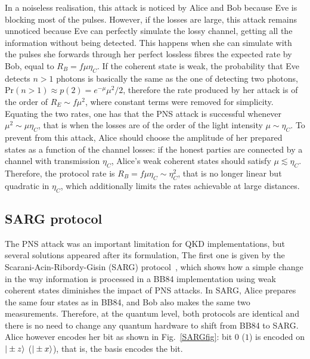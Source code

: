 \documentclass[a4paper]{article}
\begin{document}
In a noiseless realisation, this attack is noticed by Alice and Bob because Eve is blocking most of the pulses. However, if the losses are large, this attack remains unnoticed because Eve can perfectly simulate the lossy channel, getting all the information without being detected. This happens when she can simulate with the pulses she forwards through her perfect lossless fibres the expected rate by Bob, equal to $R_B=f\mu\eta_C$. If the coherent state is weak, the probability that Eve detects $n>1$ photons is basically the same as the one of detecting two photons, $\text{Pr}(n>1)\approx p(2)=e^{-\mu}\mu^2/2$, therefore the rate produced by her attack is of the order of $R_E\sim f\mu^2$, where constant terms were removed for simplicity. Equating the two rates, one has that the PNS attack is successful whenever $\mu^2\sim \mu\eta_C$, that is when the losses are of the order of the light intensity $\mu\sim\eta_C$. To prevent from this attack, Alice should choose the amplitude of her prepared states as a function of the channel losses: if the honest parties are connected by a channel with transmission $\eta_C$, Alice's weak coherent states should satisfy $\mu\lesssim\eta_C$. Therefore, the protocol rate is $R_B=f\mu\eta_C\sim\eta_C^2$, that is no longer linear but quadratic in $\eta_C$, which additionally limits the rates achievable at large distances.

\subsection{SARG protocol}

The PNS attack was an important limitation for QKD implementations, but several solutions appeared after its formulation, The first one is given by the Scarani-Acin-Ribordy-Gisin (SARG) protocol~\cite{SARG}, which shows how a simple change in the way information is processed in a BB84 implementation using weak coherent states diminishes the impact of PNS attacks. In SARG, Alice prepares the same four states as in BB84, and Bob also makes the same two measurements. Therefore, at the quantum level, both protocols are identical and there is no need to change any quantum hardware to shift from BB84 to SARG.  Alice however encodes her bit as shown in Fig.~\ref{SARGfig}: bit $0$ ($1$) is encoded on $|\pm z\rangle$ ($|\pm x\rangle$), that is, the basis encodes the bit.
\end{document}
